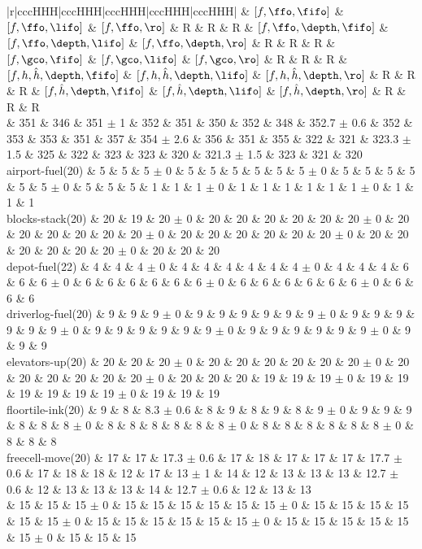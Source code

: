 \begin{center}
\begin{tabular}{|r|cccHHH|cccHHH|cccHHH|cccHHH|cccHHH|}
 & $[f,\ffo,\fifo]$ & $[f,\ffo,\lifo]$ & $[f,\ffo,\ro]$ & R & R & R & $[f,\ffo,\depth,\fifo]$ & $[f,\ffo,\depth,\lifo]$ & $[f,\ffo,\depth,\ro]$ & R & R & R & $[f,\gco,\fifo]$ & $[f,\gco,\lifo]$ & $[f,\gco,\ro]$ & R & R & R & $[f,h,\hat{h},\depth,\fifo]$ & $[f,h,\hat{h},\depth,\lifo]$ & $[f,h,\hat{h},\depth,\ro]$ & R & R & R & $[f,\hat{h},\depth,\fifo]$ & $[f,\hat{h},\depth,\lifo]$ & $[f,\hat{h},\depth,\ro]$ & R & R & R\\
\hline
 & 351 & 346 & 351 $\pm$ 1 & 352 & 351 & 350 & 352 & 348 & 352.7 $\pm$ 0.6 & 352 & 353 & 353 & 351 & 357 & 354 $\pm$ 2.6 & 356 & 351 & 355 & 322 & 321 & 323.3 $\pm$ 1.5 & 325 & 322 & 323 & 323 & 320 & 321.3 $\pm$ 1.5 & 323 & 321 & 320\\
\hline
airport-fuel(20) & 5 & 5 & 5 $\pm$ 0 & 5 & 5 & 5 & 5 & 5 & 5 $\pm$ 0 & 5 & 5 & 5 & 5 & 5 & 5 $\pm$ 0 & 5 & 5 & 5 & 1 & 1 & 1 $\pm$ 0 & 1 & 1 & 1 & 1 & 1 & 1 $\pm$ 0 & 1 & 1 & 1\\
blocks-stack(20) & 20 & 19 & 20 $\pm$ 0 & 20 & 20 & 20 & 20 & 20 & 20 $\pm$ 0 & 20 & 20 & 20 & 20 & 20 & 20 $\pm$ 0 & 20 & 20 & 20 & 20 & 20 & 20 $\pm$ 0 & 20 & 20 & 20 & 20 & 20 & 20 $\pm$ 0 & 20 & 20 & 20\\
depot-fuel(22) & 4 & 4 & 4 $\pm$ 0 & 4 & 4 & 4 & 4 & 4 & 4 $\pm$ 0 & 4 & 4 & 4 & 6 & 6 & 6 $\pm$ 0 & 6 & 6 & 6 & 6 & 6 & 6 $\pm$ 0 & 6 & 6 & 6 & 6 & 6 & 6 $\pm$ 0 & 6 & 6 & 6\\
driverlog-fuel(20) & 9 & 9 & 9 $\pm$ 0 & 9 & 9 & 9 & 9 & 9 & 9 $\pm$ 0 & 9 & 9 & 9 & 9 & 9 & 9 $\pm$ 0 & 9 & 9 & 9 & 9 & 9 & 9 $\pm$ 0 & 9 & 9 & 9 & 9 & 9 & 9 $\pm$ 0 & 9 & 9 & 9\\
elevators-up(20) & 20 & 20 & 20 $\pm$ 0 & 20 & 20 & 20 & 20 & 20 & 20 $\pm$ 0 & 20 & 20 & 20 & 20 & 20 & 20 $\pm$ 0 & 20 & 20 & 20 & 19 & 19 & 19 $\pm$ 0 & 19 & 19 & 19 & 19 & 19 & 19 $\pm$ 0 & 19 & 19 & 19\\
floortile-ink(20) & 9 & 8 & 8.3 $\pm$ 0.6 & 8 & 9 & 8 & 9 & 8 & 9 $\pm$ 0 & 9 & 9 & 9 & 8 & 8 & 8 $\pm$ 0 & 8 & 8 & 8 & 8 & 8 & 8 $\pm$ 0 & 8 & 8 & 8 & 8 & 8 & 8 $\pm$ 0 & 8 & 8 & 8\\
freecell-move(20) & 17 & 17 & 17.3 $\pm$ 0.6 & 17 & 18 & 17 & 17 & 17 & 17.7 $\pm$ 0.6 & 17 & 18 & 18 & 12 & 17 & 13 $\pm$ 1 & 14 & 12 & 13 & 13 & 13 & 12.7 $\pm$ 0.6 & 12 & 13 & 13 & 13 & 14 & 12.7 $\pm$ 0.6 & 12 & 13 & 13\\
 & 15 & 15 & 15 $\pm$ 0 & 15 & 15 & 15 & 15 & 15 & 15 $\pm$ 0 & 15 & 15 & 15 & 15 & 15 & 15 $\pm$ 0 & 15 & 15 & 15 & 15 & 15 & 15 $\pm$ 0 & 15 & 15 & 15 & 15 & 15 & 15 $\pm$ 0 & 15 & 15 & 15\\

\end{tabular}
\end{center}
